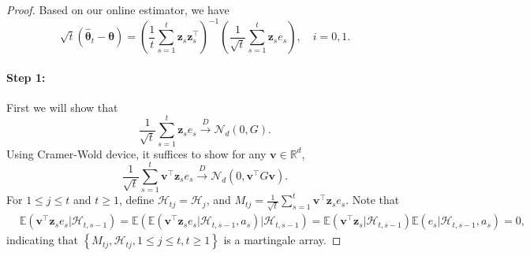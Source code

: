 \documentclass[12pt]{article}
\begin{document}
\begin{proof}
    Based on our online estimator, we have
\begin{equation*}
    \sqrt{t}(\widehat{\bm{\theta}}_{t} - \bm{\theta}) = \left(\frac{1}{t} \sum_{s=1}^t \bm{z}_s \bm{z}_s^{\top}\right)^{-1} \left( \frac{1}{\sqrt{t}} \sum_{s=1}^t \bm{z}_s e_s \right), \quad i=0,1.
\end{equation*}

\paragraph{Step 1:} First we will show that
$$\frac{1}{\sqrt{t}} \sum_{s=1}^t \bm{z}_s e_s \stackrel{D}{\to}\mathcal{N}_d(0,G).$$
Using Cramer-Wold device, it suffices to show for any $\bm{v} \in \mathbb{R}^d$, $$\frac{1}{\sqrt{t}} \sum_{s=1}^t \bm{v}^{\top}\bm{z}_s e_s \stackrel{D}{\to}\mathcal{N}_d(0,\bm{v}^{\top} G \bm{v}).$$
For $1 \le j\le t$ and $t \ge 1$, define $\mathcal{H}_{tj} = \mathcal{H}_j$, and $M_{tj} = \frac{1}{\sqrt{t}} \sum_{s=1}^t \bm{v}^{\top} \bm{z}_s e_s$.
Note that 
\begin{align*}
&\mathbb{E}(\bm{v}^{\top} \bm{z}_s e_s \vert \mathcal{H}_{t,s-1}) = \mathbb{E}(\mathbb{E}(\bm{v}^{\top} \bm{z}_s e_s\vert \mathcal{H}_{t,s-1},a_s) \vert \mathcal{H}_{t,s-1})= \mathbb{E}(\bm{v}^{\top} \bm{z}_s \vert \mathcal{H}_{t,s-1}) \mathbb{E}(e_s\vert \mathcal{H}_{t,s-1},a_s)=0,
\end{align*}
indicating that $\left\{M_{tj},\mathcal{H}_{tj}, 1\le j\le t, t\ge 1 \right\}$ is a martingale array. 


\end{proof}
\end{document}

